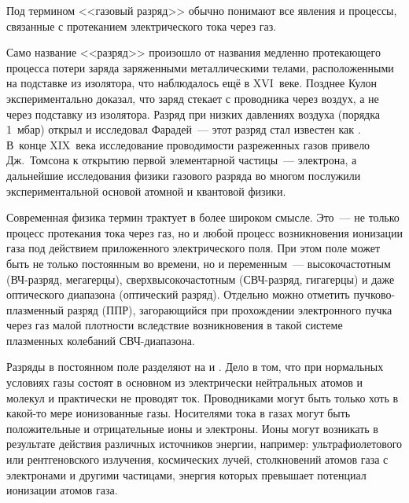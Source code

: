 \begin{labsupplement}
\label{sec:discharge}

Под термином <<газовый разряд>> обычно понимают все явления и процессы,
связанные с протеканием электрического тока через газ.

Само название <<разряд>> произошло от названия медленно протекающего
процесса потери заряда заряженными металлическими телами,
расположенными на подставке из изолятора, что наблюдалось ещё в
XVI~веке. Позднее Кулон экспериментально доказал, что заряд стекает
с проводника через воздух, а не через подставку из изолятора.
Разряд при низких давлениях воздуха (порядка 1~мбар) открыл и исследовал
Фарадей~--- этот разряд стал известен как . В~конце XIX~века
исследование проводимости разреженных газов привело Дж.~Томсона к
открытию первой элементарной частицы~--- электрона, а дальнейшие исследования
физики газового разряда во многом послужили экспериментальной основой
атомной и квантовой физики.


Современная физика термин  трактует в более широком
смысле. Это~--- не только процесс протекания тока через газ, но и любой процесс
возникновения ионизации газа под действием приложенного электрического поля.
При этом поле может быть не только постоянным во времени,
но и переменным~--- высокочастотным (ВЧ-разряд, мегагерцы),
сверхвысокочастотным (СВЧ-разряд, гигагерцы) и даже оптического диапазона
(оптический разряд). Отдельно можно отметить пучково-плазменный разряд (ППР),
загорающийся при прохождении электронного пучка через газ малой плотности
вследствие возникновения в такой системе плазменных колебаний СВЧ-диапазона.

Разряды в постоянном поле разделяют на  и
. Дело в том, что при нормальных
условиях газы состоят в основном из электрически нейтральных атомов и
молекул и практически не проводят ток.
Проводниками могут быть только хоть в какой-то мере ионизованные газы.
Носителями тока в газах могут быть положительные и отрицательные ионы и электроны.
Ионы могут возникать в результате действия различных
источников энергии, например: ультрафиолетового или рентгеновского излучения,
космических лучей, столкновений атомов газа с электронами и другими частицами, энергия
которых превышает потенциал ионизации атомов газа.


\end{labsupplement}
